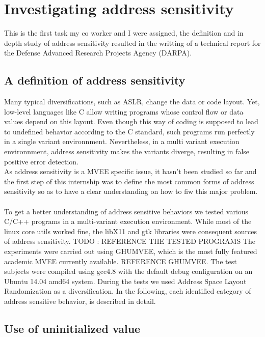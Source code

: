 \documentclass[english]{enstaPRE}
\begin{document}
\chapter{Investigating address sensitivity}

This is the first task my co worker and I were assigned, the definition and in depth study of address sensitivity resulted in the
writting of a technical report for the Defense Advanced Research Projects Agency (DARPA). 

\section{A definition of address sensitivity}

Many typical diversifications, such as ASLR, change the data or code layout. Yet, low-level languages like C allow writing programs whose
control flow or data values depend on this layout. Even though this way of coding is supposed to lead to undefined behavior according to the C standard, 
such programs run perfectly in a single variant environnment. Nevertheless, in a multi variant execution environnment, address sensitivity makes the variants
diverge, resulting in false positive error detection. \\
As address sensitivity is a MVEE specific issue, it hasn't been studied so far and the first step of this internship was to define the most common forms of address
sensitivity so as to have a clear understanding on how to fiw this major problem. \\ \\
To get a better understanding of address sensitive behaviors we tested various C/C++
programs in a multi-variant execution environment. While most of the linux core utils
worked fine, the libX11 and gtk libraries were consequent sources of address sensitivity.
TODO : REFERENCE THE TESTED PROGRAMS
The experiments were carried out using GHUMVEE, which is the most fully featured academic MVEE currently available. REFERENCE GHUMVEE.
The test subjects were compiled using gcc4.8
with the default debug configuration on an Ubuntu 14.04 amd64 system. During the tests we used Address Space Layout Randomization as a diversification.
In the following, each identified category of address sensitive behavior, is described in detail.

\section{Use of uninitialized value} \label{uninit}
\end{document}
